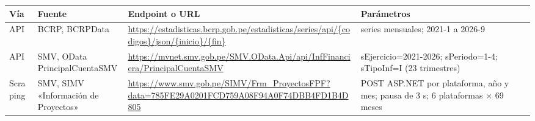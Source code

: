 \begin{longtable}{@{}>{\RaggedRight\arraybackslash}p{1.6cm}>{\RaggedRight\arraybackslash}p{2.8cm}>{\RaggedRight\arraybackslash}p{5.8cm}>{\RaggedRight\arraybackslash}p{3.9cm}@{}}
\toprule
Vía & Fuente & Endpoint o URL & Parámetros \\
\midrule
\endhead
API & BCRP, BCRPData & \url{https://estadisticas.bcrp.gob.pe/estadisticas/series/api/{codigos}/json/{inicio}/{fin}} & 10 series mensuales; 2021-1 a 2026-9 \\
API & SMV, OData PrincipalCuentaSMV & \url{https://mvnet.smv.gob.pe/SMV.OData.Api/api/InfFinanciera/PrincipalCuentaSMV} & sEjercicio=2021-2026; sPeriodo=1-4; sTipoInf=I (23 trimestres) \\
Scraping & SMV, SIMV «Información de Proyectos» & \url{https://www.smv.gob.pe/SIMV/Frm_ProyectosFPF?data=785FE29A0201FCD759A08F94A0F74DBB4FD1B4D805} & POST ASP.NET por plataforma, año y mes; pausa de 3 s; 6 plataformas × 69 meses \\
\bottomrule
\end{longtable}
